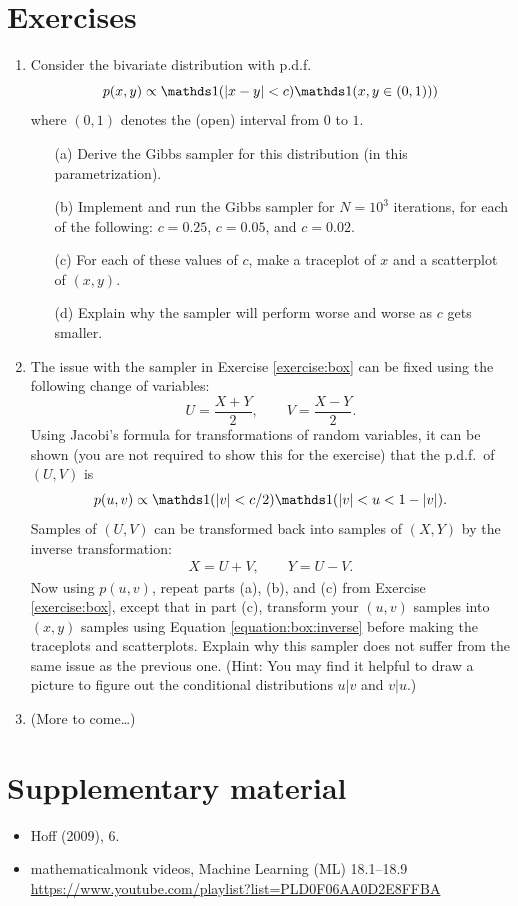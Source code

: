 \documentclass[12pt]{article}
\begin{document}
\section{Exercises}
\begin{enumerate}
\item \label{exercise:box} Consider the bivariate distribution with p.d.f.
$$ p(x,y)\propto \I(|x - y|<c)\I (x,y\in (0, 1))) $$
where $(0,1)$ denotes the (open) interval from $0$ to $1$. 
\begin{enumerate}
    \item[(a)] Derive the Gibbs sampler for this distribution (in this parametrization).
    \item[(b)] Implement and run the Gibbs sampler for $N = 10^3$ iterations, for each of the following: $c = 0.25$, $c = 0.05$, and $c = 0.02$.
    \item[(c)] For each of these values of $c$, make a traceplot of $x$ and a scatterplot of $(x,y)$.
    \item[(d)] Explain why the sampler will perform worse and worse as $c$ gets smaller.
\end{enumerate}
\item The issue with the sampler in Exercise \ref{exercise:box} can be fixed using the following change of variables:
$$ U =\frac{X + Y}{2},\qquad V =\frac{X - Y}{2}. $$
Using Jacobi's formula for transformations of random variables, it can be shown (you are not required to show this for the exercise) that the p.d.f.\ of $(U,V)$ is
$$ p(u,v) \propto \I(|v|<c/2)\I(|v|<u<1-|v|). $$
Samples of $(U,V)$ can be transformed back into samples of $(X,Y)$ by the inverse transformation:
\begin{align}\label{equation:box:inverse}
X = U + V,\qquad Y = U - V.
\end{align}
Now using $p(u,v)$, repeat parts (a), (b), and (c) from Exercise \ref{exercise:box}, except that in part (c), transform your $(u,v)$ samples into $(x,y)$ samples using Equation \ref{equation:box:inverse} before making the traceplots and scatterplots. Explain why this sampler does not suffer from the same issue as the previous one. (Hint: You may find it helpful to draw a picture to figure out the conditional distributions $u|v$ and $v|u$.)
\item (More to come\dots)
\end{enumerate}





\section*{Supplementary material}
\begin{itemize}
\item Hoff (2009), 6.
\item mathematicalmonk videos, Machine Learning (ML) 18.1--18.9 \\ 
    \url{https://www.youtube.com/playlist?list=PLD0F06AA0D2E8FFBA}
\end{itemize}
\end{document}
